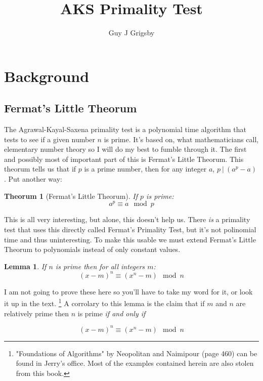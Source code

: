 \documentclass[11pt]{article}
\title{\textbf{AKS Primality Test}}
\author{Guy J Grigsby}
\begin{document}
\maketitle
\vspace{5pc}
\section{Background}
\subsection{Fermat's Little Theorum}
The Agrawal-Kayal-Saxena primality test is a polynomial time algorithm that tests to see if a given number $n$ is prime. It's based on, what mathematicians call, elementary number theory so I will do my best to fumble through it. The first and possibly most of important part of this is Fermat's Little Theorum. This theorum tells us that if $p$ is a prime number, then for any integer $a$, $p\ |\ (a^p - a)$. Put another way:
	
\newtheorem{thm}{Theorum}\label{fermat}
\begin{thm}[Fermat's Little Theorum]
If $p$ is prime:
\begin{equation}
a^p \equiv a \mod p
\end{equation}
\end{thm}
This is all very interesting, but alone, this doesn't help us. There \emph{is} a primality test that uses this directly called Fermat's Primality Test, but it's not polinomial time and thus uninteresting. To make this usable we must extend Fermat's Little Theorum to polynomials instead of only constant values.

\newtheorem{lemma}{Lemma}\label{congruencyLemma}
\begin{lemma}
If $n$ is prime then for all integers $m$:
\begin{equation}
(x-m)^n \equiv (x^n -m) \mod n
\end{equation}
\end{lemma}

I am not going to prove these here so you'll have to take my word for it, or look it up in the text. \footnote{"Foundations of Algorithms" by Neopolitan and Naimipour (page 460) can be found in Jerry's office. Most of the examples contained herein are also stolen from this book.} A corrolary to this lemma is the claim that if $m$ and $n$ are relatively prime then $n$ is prime \emph{if and only if}

$$(x-m)^n \equiv (x^n -m) \mod n$$
\end{document}
